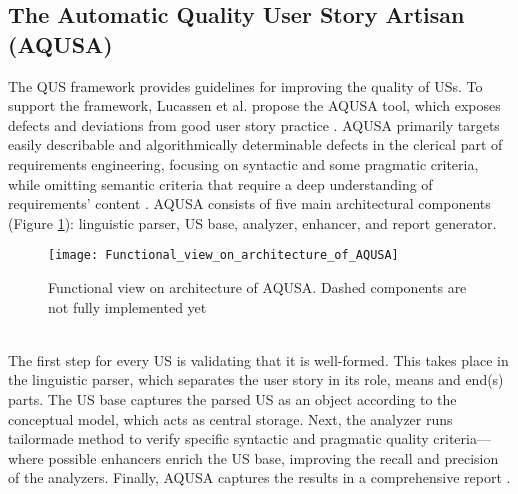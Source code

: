 \subsection{The Automatic Quality User Story Artisan (AQUSA)} \label{usq_4}
The QUS framework provides guidelines for improving the quality of USs. To support the framework, Lucassen et al. propose the AQUSA tool, which exposes defects and deviations from good user story practice \cite{lucassen2016improving}. AQUSA primarily targets easily describable and algorithmically determinable defects in the clerical part of requirements engineering, focusing on syntactic and some pragmatic criteria, while omitting semantic criteria that require a deep understanding of requirements' content \cite{lucassen2016improving}.
AQUSA consists of ﬁve main architectural components (Figure \ref{fig:aqusa}): linguistic parser, US base, analyzer, enhancer, and report generator.
\begin{figure}
\center
\texttt{[image: Functional\_view\_on\_architecture\_of\_AQUSA]}
\caption{Functional view on architecture of AQUSA. Dashed components are not fully implemented yet \cite{lucassen2016improving}}\label{fig:aqusa}
\end{figure} \\ 

The ﬁrst step for every US is validating that it is well-formed. This takes place in the linguistic parser, which separates the user story in its role, means and end(s) parts. The US base captures the parsed US as an object according to the conceptual model, which acts as central storage.  Next, the analyzer runs tailormade method to verify speciﬁc syntactic and pragmatic quality criteria—where possible enhancers enrich the US base, improving the recall and precision of the analyzers. Finally, AQUSA captures the results in a comprehensive report \cite{lucassen2016improving}.

